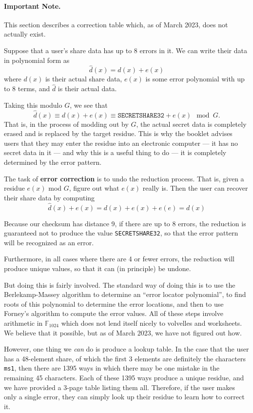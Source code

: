 \documentclass[letterpaper]{article}
\newcommand{\ftttwo}{\mathbb{F}_{1024}}
\newcommand{\vc}[1]{\texttt{#1}} %
\begin{document}
\paragraph{Important Note.} {\color{BrickRed}This section describes a correction
table which, as of March 2023, does not actually exist.}

Suppose that a user's share data has up to 8 errors in it. We can write their data
in polynomial form as
\[ \hat{d}(x) = d(x) + e(x) \]
where $d(x)$ is their actual share data, $e(x)$ is some error polynomial with up
to 8 terms, and $\hat{d}$ is their actual data.

Taking this modulo $G$, we see that
\[ \hat{d}(x) \equiv d(x) + e(x) \equiv \vc{SECRETSHARE32} + e(x) \mod G. \]
That is, in the process of modding out by $G$, the actual secret data is completely
erased and is replaced by the target residue. This is why the booklet advises users
that they may enter the residue into an electronic computer --- it has no secret
data in it --- and why this is a useful thing to do --- it is completely determined
by the error pattern.

The task of \textbf{error correction} is to undo the reduction process. That is,
given a residue $e(x)$ mod $G$, figure out what $e(x)$ really is. Then the user
can recover their share data by computing
\[ \hat{d}(x) + e(x) = d(x) + e(x) + e(e) = d(x) \]

Because our checksum has distance 9, if there are up to 8 errors, the reduction
is guaranteed not to produce the value \vc{SECRETSHARE32}, so that the error
pattern will be recognized as an error.

Furthermore, in all cases where there are 4 or fewer errors, the reduction will
produce unique values, so that it can (in principle) be undone.

But doing this is fairly involved. The standard way of doing this is to use the
Berlekamp-Massey algorithm to determine an ``error locator polynomial'', to
find roots of this polynomial to determine the error locations, and then to use
Forney's algorithm to compute the error values. All of these steps involve
arithmetic in $\ftttwo$ which does not lend itself nicely to volvelles and
worksheets. We believe that it possible, but as of March 2023, we have not
figured out how.

However, one thing we \emph{can} do is produce a lookup table. In the case that
the user has a 48-element share, of which the first 3 elements are definitely
the characters \vc{ms1}, then there are 1395 ways in which there may be one
mistake in the remaining 45 characters. Each of these 1395 ways produce a unique
residue, and we have provided a 3-page table listing them all. Therefore, if
the user makes only a single error, they can simply look up their residue to
learn how to correct it.
\end{document}
